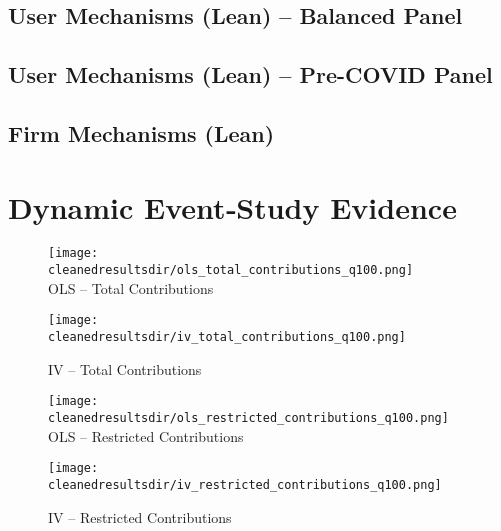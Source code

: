 \documentclass{article}
\newcommand{\cleanedresultsdir}{../../results/cleaned}
\begin{document}
\begin{landscape}
\subsection{User Mechanisms (Lean) -- Balanced Panel}

\end{landscape}

\begin{landscape}
\subsection{User Mechanisms (Lean) -- Pre-COVID Panel}

\end{landscape}

\clearpage
\begin{landscape}
\subsection{Firm Mechanisms (Lean)}

\end{landscape}

\clearpage
\section{Dynamic Event‐Study Evidence}


\begin{figure}[H]
  \centering
  \texttt{[image: \\cleanedresultsdir/ols\_total\_contributions\_q100.png]}\\[2pt]
  \caption*{OLS – Total Contributions}
  \texttt{[image: \\cleanedresultsdir/iv\_total\_contributions\_q100.png]}\\[2pt]
  \caption*{IV – Total Contributions}
\end{figure}

\clearpage

\begin{figure}[H]
  \centering
  \texttt{[image: \\cleanedresultsdir/ols\_restricted\_contributions\_q100.png]}\\[2pt]
  \caption*{OLS – Restricted Contributions}
  \texttt{[image: \\cleanedresultsdir/iv\_restricted\_contributions\_q100.png]}\\[2pt]
  \caption*{IV – Restricted Contributions}
\end{figure}
\end{document}
